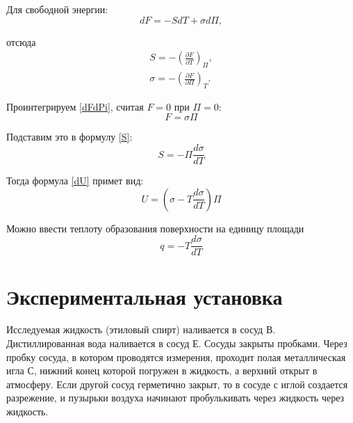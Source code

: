 \documentclass[12pt]{article}
\begin{document}
    Для свободной энергии:
    \begin{equation}
        dF = -SdT + \sigma d\Pi,
    \end{equation}

    отсюда
    \begin{eqnarray}
        S = -\left(\frac{\partial F}{\partial T}\right)_{\Pi}, \label{S}\\
        \sigma = -\left(\frac{\partial F}{\partial \Pi}\right)_T.
        \label{dFdPi}
    \end{eqnarray}

    Проинтегрируем \ref{dFdPi}, считая $F = 0$ при $\Pi = 0$:
    \begin{equation}
        F = \sigma \Pi
    \end{equation}

    Подставим это в формулу \ref{S}:
    \begin{equation}
        S = -\Pi \frac{d\sigma}{dT}
    \end{equation}

    Тогда формула \ref{dU} примет вид:
    \begin{equation}
        U = \left(\sigma - T\frac{d\sigma}{dT}\right)\Pi
        \label{U}
    \end{equation}

    Можно ввести теплоту образования поверхности на единицу площади
    \begin{equation}
        q = -T\frac{d\sigma}{dT}
        \label{q}
    \end{equation}

    \section{Экспериментальная установка}
    Исследуемая жидкость (этиловый спирт) наливается в сосуд В.
    Дистиллированная вода наливается в сосуд Е. Сосуды закрыты пробками. Через
    пробку сосуда, в котором проводятся измерения, проходит полая металлическая игла
    С, нижний конец которой погружен в жидкость, а верхний открыт в атмосферу. Если
    другой сосуд герметично закрыт, то в сосуде с иглой создается разрежение,
    и пузырьки воздуха начинают пробулькивать через жидкость через жидкость.
\end{document}
